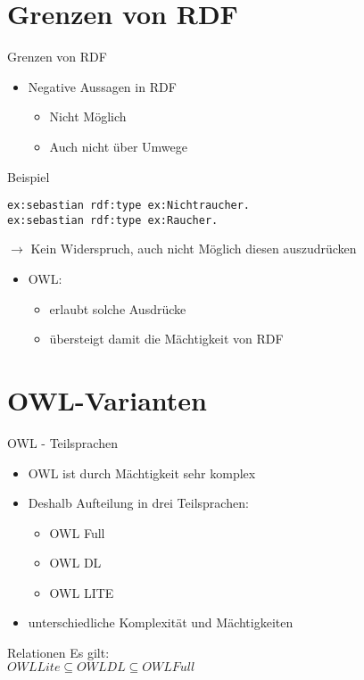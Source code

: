 \documentclass{beamer}
\begin{document}
\section{Grenzen von RDF}

\begin{frame}[fragile]{Grenzen von RDF}
\begin{itemize}
\item Negative Aussagen in RDF
\begin{itemize}
\item Nicht Möglich
\item Auch nicht über Umwege
\end{itemize}
\end{itemize}
\begin{exampleblock}{Beispiel}
\begin{lstlisting}
ex:sebastian rdf:type ex:Nichtraucher.
ex:sebastian rdf:type ex:Raucher.
\end{lstlisting}
$\rightarrow$ Kein Widerspruch, auch nicht Möglich diesen auszudrücken
\end{exampleblock}

\begin{itemize}
\item OWL:
\begin{itemize}
\item erlaubt solche Ausdrücke
\item übersteigt damit die Mächtigkeit von RDF
\end{itemize}
\end{itemize}
\end{frame}


\section{OWL-Varianten}
\begin{frame}{OWL - Teilsprachen}
\begin{itemize}
	\item OWL ist durch Mächtigkeit sehr komplex
	\item Deshalb Aufteilung in drei Teilsprachen:
\begin{itemize}
	\item OWL Full
	\item OWL DL
	\item OWL LITE
\end{itemize}
	\item unterschiedliche Komplexität und Mächtigkeiten
\end{itemize}
\begin{block}{Relationen}
	Es gilt:\\
	$OWL Lite \subseteq OWL DL \subseteq OWL Full$
\end{block}
\end{frame}
\end{document}
